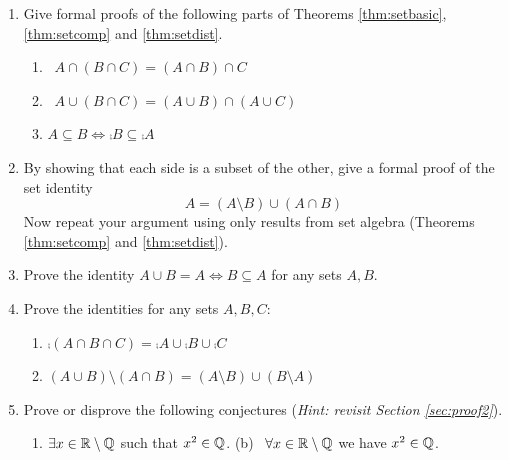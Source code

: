 \begin{exercises}{}{}
\begin{enumerate}
		\item Give formal proofs of the following parts of Theorems \ref{thm:setbasic}, \ref{thm:setcomp} and \ref{thm:setdist}. %
		\begin{enumerate}
		  \item {} \ $A\cap (B\cap C)=(A\cap B)\cap C$
		  \setcounter{enumii}{2}
			\item {} \ $A\cup(B\cap C)=(A\cup B)\cap(A\cup C)$
			\setcounter{enumii}{4}
			\item $A\subseteq B\iff \comp B\subseteq \comp A$
		\end{enumerate}
	
	
		\item By showing that each side is a subset of the other, give a formal proof of the set identity
		\[
			A=(A\setminus B)\cup (A\cap B)
		\]
		Now repeat your argument using only results from set algebra (Theorems \ref{thm:setcomp} and \ref{thm:setdist}).
	
	
	\item Prove the identity $A\cup B=A\iff B\subseteq A$ for any sets $A,B$.
	
	
	\item Prove the identities for any sets $A,B,C$:
	\begin{enumerate}
	  \item $\comp{(A\cap B\cap C)}=\comp A\cup\comp B\cup\comp C$
	  \item $(A\cup B)\setminus (A\cap B)=(A\setminus B)\cup (B\setminus A)$
	\end{enumerate}
	
		
	\item Prove or disprove the following conjectures (\emph{Hint: revisit Section \ref{sec:proof2}}).
	 \begin{enumerate}
	    \item $\exists x\in\mathbb{R}\setminus\mathbb{Q}$ such that $x^2\in\mathbb{Q}$. \qquad\qquad (b) \ $\forall x\in\mathbb{R}\setminus\mathbb{Q}$ we have $x^2\in\mathbb{Q}$.
		\end{enumerate}
	

\end{enumerate}
\end{exercises}
